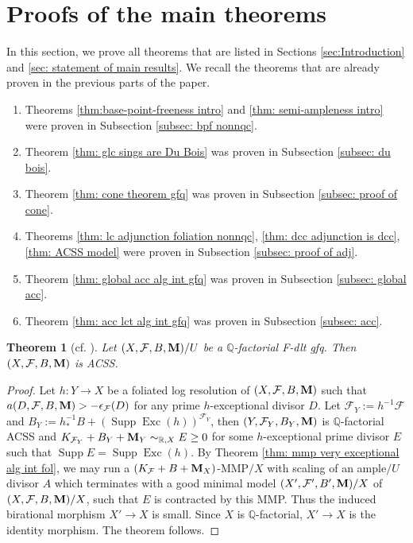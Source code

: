 \documentclass[11pt]{amsart}
\numberwithin{equation}{section}
\newcommand{\Mm}{{\bf{M}}}
\newcommand{\Qq}{\mathbb{Q}}
\newcommand{\Exc}{\operatorname{Exc}}
\newcommand{\Supp}{\operatorname{Supp}}
\newcommand{\Ff}{\mathcal{F}}
\newtheorem{thm}{Theorem}[subsection]
\theoremstyle{definition}
\theoremstyle{definition}
\theoremstyle{definition}
\begin{document}
\section{Proofs of the main theorems}\label{sec: proof of the main theorems}

In this section, we prove all theorems that are listed in Sections \ref{sec:Introduction} and \ref{sec: statement of main results}. We recall the theorems that are already proven in the previous parts of the paper.
\begin{enumerate}
    \item Theorems \ref{thm:base-point-freeness intro} and \ref{thm: semi-ampleness intro} were proven in Subsection \ref{subsec: bpf nonnqc}.
    \item Theorem \ref{thm: glc sings are Du Bois} was proven in Subsection \ref{subsec: du bois}.
    \item Theorem \ref{thm: cone theorem gfq} was proven in Subsection \ref{subsec: proof of cone}.
    \item Theorems \ref{thm: lc adjunction foliation nonnqc}, \ref{thm: dcc adjunction is dcc}, \ref{thm:  ACSS model} were proven in Subsection \ref{subsec: proof of adj}.
    \item Theorem \ref{thm: global acc alg int gfq} was proven in Subsection \ref{subsec: global acc}.
    \item Theorem \ref{thm: acc lct alg int gfq} was proven in Subsection \ref{subsec: acc}.
\end{enumerate}

\begin{thm}[{cf. \cite[Conjecture 4.2(1)]{CS23a}}]\label{thm: fdlt is acss}
    Let $(X,\Ff,B,\Mm)/U$ be a $\Qq$-factorial F-dlt gfq. Then $(X,\Ff,B,\Mm)$ is ACSS.
\end{thm}
\begin{proof}
    Let $h: Y\rightarrow X$ be a foliated log resolution of  $(X,\Ff,B,\Mm)$ such that $a(D,\Ff,B,\Mm)>-\epsilon_{\Ff}(D)$ for any prime $h$-exceptional divisor $D$. Let $\Ff_Y:=h^{-1}\Ff$ and $B_Y:=h^{-1}_*B+(\Supp\Exc(h))^{\Ff_Y}$, then $(Y,\Ff_Y,B_Y,\Mm)$ is $\Qq$-factorial ACSS and $K_{\Ff_Y}+B_Y+\Mm_Y\sim_{\mathbb R,X}E\geq 0$
    for some $h$-exceptional prime divisor $E$ such that $\Supp E=\Supp\Exc(h)$. By Theorem \ref{thm: mmp very exceptional alg int fol}, we may run a $(K_{\Ff}+B+\Mm_X)$-MMP$/X$ with scaling of an ample$/U$ divisor $A$ which terminates with a good minimal model $(X',\Ff',B',\Mm)/X$ of $(X,\Ff,B,\Mm)/X$, such that $E$ is contracted by this MMP. Thus the induced birational morphism $X'\rightarrow X$ is small. Since $X$ is $\Qq$-factorial, $X'\rightarrow X$ is the identity morphism. The theorem follows.
\end{proof}
\end{document}
